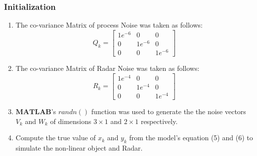 \documentclass[a4paper,11pt]{article}
\theoremstyle{mytheor}
\begin{document}
\subsubsection{Initialization}
\begin{enumerate}
    \item 
    The co-variance Matrix of process Noise was taken as follows: 
\begin{equation*}
    Q_k = 
    \begin{bmatrix}
    1e^{-6} & 0 & 0\\
    0 & 1e^{-6} & 0 \\
    0 & 0 & 1e^{-6}
    \end{bmatrix}
\end{equation*}

    \item The co-variance Matrix of Radar Noise was taken as follows: 
\begin{equation*}
    R_k = 
    \begin{bmatrix}
    1e^{-4} & 0 & 0\\
    0 & 1e^{-4} & 0 \\
    0 & 0 & 1e^{-4}
    \end{bmatrix}
\end{equation*}
    
    \item 
    $\mathbf{MATLAB}$'s $randn()$ function was used to generate the the noise vectors $V_k$ and $W_k$ of dimensions $3\times 1$ and $2 \times 1$ respectively.  

    \item 
    Compute the true value of $x_k$ and $y_k$ from the model's equation (5) and (6) to simulate the non-linear object and Radar.
    
\end{enumerate}
\end{document}
